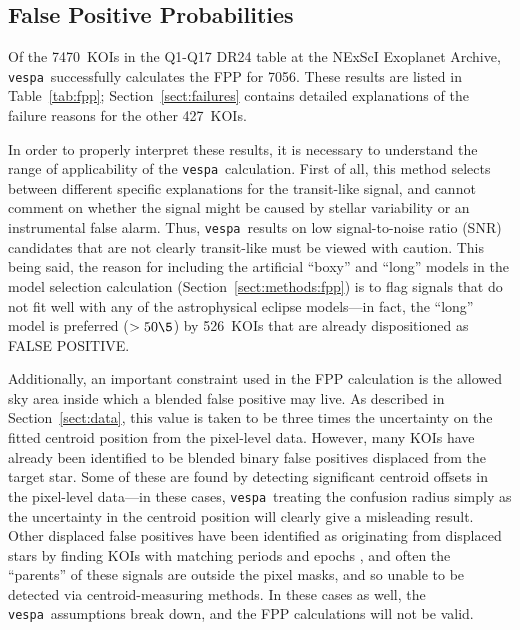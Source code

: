 \documentclass{emulateapj}
\newcommand{\Tab}[1]{Table~\ref{tab:#1}}
\newcommand{\tab}[1]{\Tab{#1}}
\newcommand{\sectionname}{Section}
\newcommand{\Sect}[1]{\sectionname~\ref{sect:#1}}
\newcommand{\sect}[1]{\Sect{#1}}
\newcommand{\sectlabel}[1]{\label{sect:#1}}
\newcommand{\ntotal}{7470}
\newcommand{\nfail}{427}
\newcommand{\ncalc}{7056}
\newcommand{\nlongfp}{526}
\newcommand{\vespa}{\texttt{vespa}}
\begin{document}

\subsection{False Positive Probabilities}
\sectlabel{results:fpp}

Of the \ntotal\ KOIs in the Q1-Q17 DR24 table at the NExScI Exoplanet
Archive, \vespa\ successfully calculates the FPP for \ncalc.  These
results are listed in \tab{fpp};  \sect{failures} contains detailed
explanations of the failure reasons for the other \nfail\ KOIs.

In order to properly interpret these results, it is necessary to
understand the range of applicability of the \vespa\ calculation.
First of all, this method selects between different specific explanations 
for the transit-like signal, and cannot
comment on whether the signal might be caused by stellar variability
or an instrumental false alarm.  Thus, \vespa\ results on low
signal-to-noise ratio (SNR) candidates that are not clearly
transit-like must be viewed with caution.  This being said, the reason 
for including the artificial 
``boxy'' and ``long'' models in the model selection calculation
 (\sect{methods:fpp}) is to flag signals that do not 
fit well with any of the astrophysical eclipse models---in fact, the ``long''
model is preferred ($>50\5$) by \nlongfp\ KOIs that are already dispositioned
as FALSE POSITIVE.  


Additionally, an important constraint used in the FPP calculation is the
allowed sky area inside which a blended false positive may live.  As
described in \sect{data}, this value is taken to be three times the
uncertainty on the fitted centroid position from the pixel-level data.
However, many KOIs have already been identified to be blended binary
false positives displaced from the target star.  Some of these are
found by detecting significant centroid offsets in the pixel-level
data---in these cases, \vespa\ treating the confusion radius simply as
the uncertainty in the centroid position will clearly give a
misleading result.  Other displaced false positives have been
identified as originating from displaced stars by finding KOIs with
matching periods and epochs \citep{Coughlin:2014}, and often the
``parents'' of these signals are outside the pixel masks, and so
unable to be detected via centroid-measuring methods.  In these cases
as well, the \vespa\ assumptions break down, and the FPP calculations
will not be valid.
\end{document}
